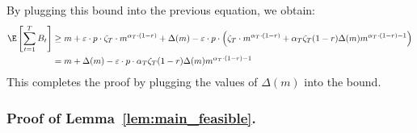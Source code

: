 \documentclass[blindrev]{informs3noheader}
\begin{document}
By plugging this bound into the previous equation, we obtain:
\begin{align*}
\E\left[\sum_{t=1}^T B_t\right]
&\geq  m + \varepsilon\cdot p\cdot\zeta_T\cdot m^{\alpha_T\cdot(1-r)} + \Delta(m)-\varepsilon\cdot p \cdot \left(\zeta_T \cdot m^{\alpha_T \cdot (1-r)} + \alpha_T\zeta_T(1-r) \Delta(m)m^{\alpha_T \cdot (1-r)-1}\right)\\
 &= m + \Delta(m) - \varepsilon\cdot p\cdot \alpha_T\zeta_T(1-r) \Delta(m)m^{\alpha_T \cdot (1-r)-1}
\end{align*}
This completes the proof by plugging the values of $\Delta(m)$ into the bound.
\hfill\Halmos
\endproof 

\subsubsection*{Proof of Lemma~\ref{lem:main_feasible}.}\
\end{document}
